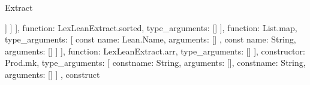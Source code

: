 \begin{lexlean}{Extract}
\begin{toolingmodule}
{{{{{{{{{{{{{{{{{{{{{{{{                                                                                }
                                                                              ]
                                                                            }
                                                                          ]
                                                                        }
                                                                      ],
                                                                      function: LexLeanExtract.sorted,
                                                                      type_arguments: []
                                                                    }
                                                                  ],
                                                                  function: List.map,
                                                                  type_arguments: [
                                                                    const{
                                                                      name: Lean.Name,
                                                                      arguments: []
                                                                    },
                                                                    const{
                                                                      name: String,
                                                                      arguments: []
                                                                    }
                                                                  ]
                                                                }
                                                              ],
                                                              function: LexLeanExtract.arr,
                                                              type_arguments: []
                                                            }
                                                          ],
                                                          constructor: Prod.mk,
                                                          type_arguments: [
                                                            const{name: String, arguments: []},
                                                            const{name: String, arguments: []}
                                                          ]
                                                        },
                                                        construct{
}}}}}}}}}}}}}}}}}}
\end{toolingmodule}
\end{lexlean}
